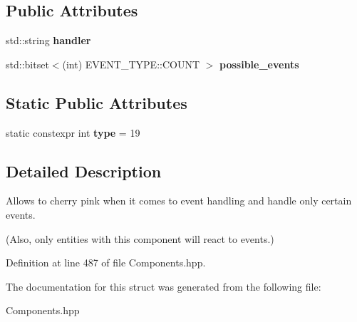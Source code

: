 \subsection*{Public Attributes}
\begin{DoxyCompactItemize}
\item 
std\+::string {\bfseries handler}\hypertarget{struct_event_handler_component_a168441f76d9101998be42bde4b5d5acf}{}\label{struct_event_handler_component_a168441f76d9101998be42bde4b5d5acf}

\item 
std\+::bitset$<$(int) E\+V\+E\+N\+T\+\_\+\+T\+Y\+P\+E\+::\+C\+O\+U\+NT $>$ {\bfseries possible\+\_\+events}\hypertarget{struct_event_handler_component_a2dff7cf5e12774036bd149c73bf591e6}{}\label{struct_event_handler_component_a2dff7cf5e12774036bd149c73bf591e6}

\end{DoxyCompactItemize}
\subsection*{Static Public Attributes}
\begin{DoxyCompactItemize}
\item 
static constexpr int {\bfseries type} = 19\hypertarget{struct_event_handler_component_a6b626d9951bf3e8359baea3fdec67d33}{}\label{struct_event_handler_component_a6b626d9951bf3e8359baea3fdec67d33}

\end{DoxyCompactItemize}


\subsection{Detailed Description}
Allows to cherry pink when it comes to event handling and handle only certain events. 

(Also, only entities with this component will react to events.) 

Definition at line 487 of file Components.\+hpp.



The documentation for this struct was generated from the following file\+:\begin{DoxyCompactItemize}
\item 
Components.\+hpp\end{DoxyCompactItemize}
